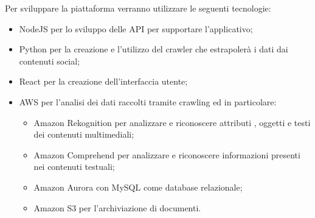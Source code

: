Per sviluppare la piattaforma verranno utilizzare le seguenti tecnologie:
\begin{itemize}
    \item NodeJS \glo{} per lo sviluppo delle API \glo{} per supportare l’applicativo;
    \item Python per la creazione e l'utilizzo del crawler che estrapolerà i dati dai contenuti social;
    \item React per la creazione dell'interfaccia utente;
    \item AWS \glo{} per l'analisi dei dati raccolti tramite crawling \glo{} ed in particolare:
    \begin{itemize}
    	\item Amazon Rekognition per analizzare e riconoscere attributi \glo{}, oggetti e testi dei contenuti multimediali;
    	\item Amazon Comprehend per analizzare e riconoscere informazioni presenti nei contenuti testuali;
    	\item Amazon Aurora con MySQL come database relazionale;
    	\item Amazon S3 per l'archiviazione di documenti.
	\end{itemize}
  \end{itemize}